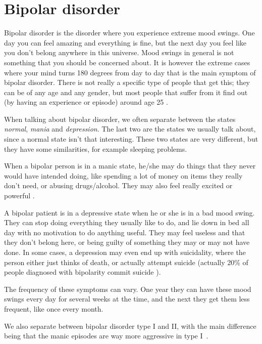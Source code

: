 \newpage
\section{Bipolar disorder}

Bipolar disorder is the disorder where you experience extreme mood swings. One day you can feel amazing and 
everything is fine, but the next day you feel like you don't belong anywhere in this universe. 
Mood swings in general is not something that you should be concerned about. It is however the extreme cases where 
your mind turns 180 degrees from day to day that is the main symptom of bipolar disorder. 
There is not really a specific type of people that get this; they can be of any age and any gender, 
but most people that suffer from it find out (by having an experience or episode) around age 25 \cite{bipolar_statistics}. 

When talking about bipolar disorder, we often separate between the states \emph{normal}, \emph{mania} 
and \emph{depression}. The last two are the states we usually talk about, since a normal state isn't that interesting. 
These two states are very different, but they have some similarities, for example sleeping problems. 

When a bipolar person is in a manic state, he/she may do things that they never would have intended doing, 
like spending a lot of money on items they really don't need, or abusing drugs/alcohol. 
They may also feel really excited or powerful \cite{bipolar_overview}. 

A bipolar patient is in a depressive state when he or she is in a bad mood swing. They can stop doing everything 
they usually like to do, and lie down in bed all day with no motivation to do anything useful. 
They may feel useless and that they don't belong here, or being guilty of something they may or may not have done. 
In some cases, a depression may even end up with suicidality, where the person either just thinks of death, 
or actually attempt suicide (actually 20\% of people diagnosed with bipolarity commit suicide \cite{bipolar_statistics}). 

The frequency of these symptoms can vary. One year they can have these mood swings every day for several weeks at the time, 
and the next they get them less frequent, like once every month. 

We also separate between bipolar disorder type I and II, with the main difference being that the manic episodes 
are way more aggressive in type I \cite{bipolar_types}.

